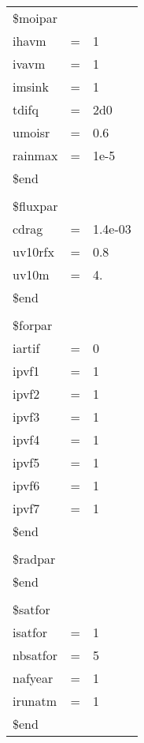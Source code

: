 \newpage
\begin{tabular}{lll}
                          \\
\$moipar             \\
 ihavm    & = & 1    \\
 ivavm    & = & 1    \\
 imsink   & = & 1    \\
 tdifq    & = & 2d0  \\
  umoisr   & = & 0.6  \\
 rainmax  & = & 1e-5 \\
\$end                \\
                            \\
\$fluxpar              \\
 cdrag    & = & 1.4e-03\\
 uv10rfx  & = & 0.8    \\
 uv10m    & = & 4.     \\
\$end                  \\
                            \\
\$forpar          \\
 iartif &   = & 0 \\
 ipvf1  &   = & 1 \\
 ipvf2  &   = & 1 \\
 ipvf3  &   = & 1 \\
 ipvf4  &   = & 1 \\
 ipvf5  &   = & 1 \\
 ipvf6  &   = & 1 \\
 ipvf7  &   = & 1 \\
\$end             \\
                           \\
\$radpar          \\
\$end             \\
                           \\
\$satfor          \\
 isatfor &  = & 1 \\
 nbsatfor&  = & 5 \\
 nafyear &  = & 1 \\
 irunatm &  = & 1 \\
\$end             \\
\end{tabular}
\newpage                 
